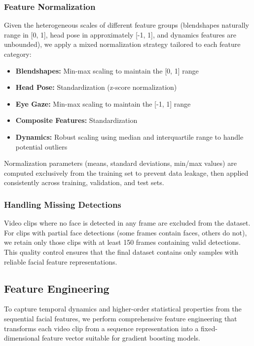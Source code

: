 \documentclass[11pt,a4paper]{article}
\begin{document}
\subsubsection{Feature Normalization}

Given the heterogeneous scales of different feature groups (blendshapes naturally range in [0, 1], head pose in approximately [-1, 1], and dynamics features are unbounded), we apply a mixed normalization strategy tailored to each feature category:

\begin{itemize}
  \item \textbf{Blendshapes:} Min-max scaling to maintain the [0, 1] range
  \item \textbf{Head Pose:} Standardization (z-score normalization)
  \item \textbf{Eye Gaze:} Min-max scaling to maintain the [-1, 1] range
  \item \textbf{Composite Features:} Standardization
  \item \textbf{Dynamics:} Robust scaling using median and interquartile range to handle potential outliers
\end{itemize}

Normalization parameters (means, standard deviations, min/max values) are computed exclusively from the training set to prevent data leakage, then applied consistently across training, validation, and test sets.

\subsubsection{Handling Missing Detections}

Video clips where no face is detected in any frame are excluded from the dataset. For clips with partial face detections (some frames contain faces, others do not), we retain only those clips with at least 150 frames containing valid detections. This quality control ensures that the final dataset contains only samples with reliable facial feature representations.

\subsection{Feature Engineering}

To capture temporal dynamics and higher-order statistical properties from the sequential facial features, we perform comprehensive feature engineering that transforms each video clip from a sequence representation into a fixed-dimensional feature vector suitable for gradient boosting models.
\end{document}
